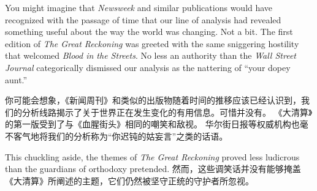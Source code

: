 \begin{paracol}{2}
	\switchcolumn*
	You might imagine that \emph{Newsweek} and similar publications would have recognized with the passage of time that our line of analysis had revealed something useful about the way the world was changing. Not a bit. The first edition of \emph{The Great Reckoning} was greeted with the same sniggering hostility that welcomed \emph{Blood in the Streets}. No less an authority than the \emph{Wall Street Journal} categorically dismissed our analysis as the nattering of ``your dopey aunt.'' 
	
	\switchcolumn
	你可能会想象，《新闻周刊》和类似的出版物随着时间的推移应该已经认识到，我们的分析线路揭示了关于世界正在发生变化的有用信息。可惜并没有。 《大清算》的第一版受到了与《血腥街头》相同的嘲笑和敌视。 华尔街日报等权威机构也毫不客气地将我们的分析称为“你迟钝的姑妄言”之类的话语。
	
	\switchcolumn*
	This chuckling aside, the themes of \emph{The Great Reckoning} proved less ludicrous than the guardians of orthodoxy pretended.
	\switchcolumn
	然而，这些调笑话并没有能够掩盖《大清算》所阐述的主题，它们仍然被坚守正统的守护者所忽视。
	

\end{paracol}

